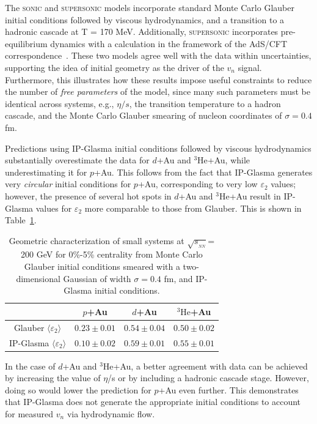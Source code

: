\documentclass[%
reprint,
showpacs,preprintnumbers,
 amsmath,amssymb,
 aps,
]{revtex4-1}
\newcommand{\sqsn}{\mbox{$\sqrt{s_{_{NN}}}$}\xspace}
\newcommand{\dau}{\mbox{$d$+Au}\xspace}
\newcommand{\pau}{\mbox{$p$+Au}\xspace}
\newcommand{\hau}{\mbox{$^3\text{He}$+Au}\xspace}
\begin{document}
The \textsc{sonic} and \textsc{supersonic} models incorporate standard Monte Carlo Glauber initial conditions followed by viscous hydrodynamics, and a transition to a hadronic cascade at T = 170 MeV. Additionally, \textsc{supersonic} incorporates pre-equilibrium dynamics with a calculation in the framework of the AdS/CFT correspondence~\cite{vanderSchee:2013pia,Chesler:2015wra,Romatschke:2013re}. These two models agree well with the data within uncertainties, supporting the idea of initial geometry as the driver of the $v_n$ signal. Furthermore, this illustrates how these results impose useful constraints to reduce the number of \emph{free parameters} of the model, since many such parameters must be identical across systems, e.g., $\eta/s$, the transition temperature to a hadron cascade, and the  Monte Carlo Glauber smearing of nucleon coordinates of $\sigma=0.4$ fm.

Predictions using IP-Glasma initial conditions followed by viscous hydrodynamics substantially overestimate the data for \dau and \hau, while underestimating it for \pau. This follows from the fact that IP-Glasma generates very \emph{circular} initial conditions for \pau, corresponding to very low $\varepsilon_2$ values; however, the presence of several hot spots in \dau and \hau result in IP-Glasma values for $\varepsilon_2$ more comparable to those from Glauber. This is shown in Table~\ref{table_geometry_glasma}. 

\begin{table}[h!]
\caption{Geometric characterization of small systems at \sqsn = 200 GeV for 0\%-5\% centrality from Monte Carlo Glauber initial conditions smeared with a two-dimensional Gaussian of width $\sigma=0.4$ fm, and IP-Glasma initial conditions.}
\begin{ruledtabular}
\begin{tabular}{c c c c}
\label{table_geometry_glasma}
 & \pau & \dau & \hau \\ \hline
 Glauber $\langle \varepsilon_2 \rangle$ & $0.23\pm 0.01$ & $0.54\pm 0.04$ & $0.50\pm 0.02$ \\
 IP-Glasma $\langle \varepsilon_2 \rangle$ & $0.10\pm 0.02$ & $0.59\pm 0.01$ & $0.55\pm 0.01$ \\
\end{tabular}
\end{ruledtabular}
\end{table}

In the case of \dau and \hau, a better agreement with data can be achieved by increasing the value of $\eta$/s or by including a hadronic cascade stage. However, doing so would lower the prediction for \pau even further. This demonstrates that IP-Glasma does not generate the appropriate initial conditions to account for measured $v_n$ via hydrodynamic flow. 
\end{document}
